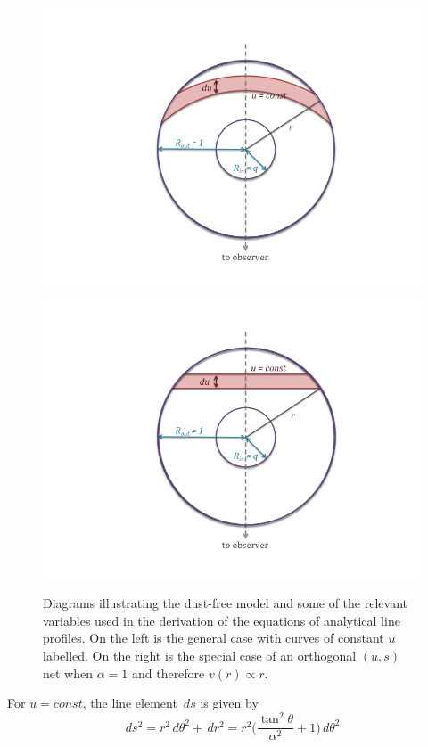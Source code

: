 \begin{figure}
\includegraphics[clip=true,scale=0.5,trim= 180 50 130 70]{chapters/chapter4/images/opt_thin_diag/curve.png}
\includegraphics[clip=true,scale=0.5,trim= 180 50 130 70]{chapters/chapter4/images/opt_thin_diag/line.png}
\caption{Diagrams illustrating the dust-free model and some of the relevant variables used in the derivation of the equations of analytical line profiles.  On the left is the general case with curves of constant $u$ labelled.  On the right is the special case of an orthogonal $(u,s)$ net when $\alpha=1$ and therefore $v(r) \propto r$.}
\label{fig:analytics}
\end{figure}


\noindent For $u=const$, the line element $\, ds$  is given by
\begin{equation}
\label{eqn:ds}
\, ds^2 = r^2 \, d\theta^2 + \, dr^2 = r^2 \Big( \frac{\tan^2\theta}{\alpha^2}+1 \Big)\, d\theta^2
\end{equation}

